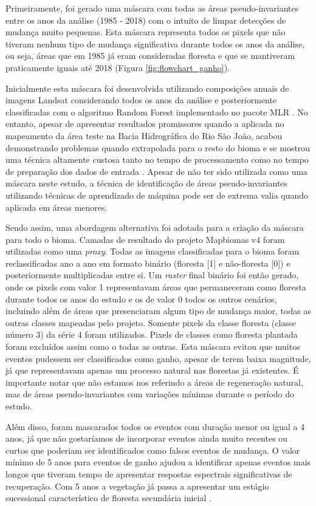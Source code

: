 Primeiramente, foi gerado uma máscara com todas as áreas pseudo-invariantes entre os anos da análise (1985 - 2018) com o intuito de limpar detecções de mudança muito pequenas. Esta máscara representa todos os pixels que não tiveram nenhum tipo de mudança significativa durante todos os anos da análise, ou seja, áreas que em 1985 já eram consideradas floresta e que se mantiveram praticamente iguais até 2018 (Figura \ref{fig:flowchart_ganho}). 

Inicialmente esta máscara foi desenvolvida utilizando composições anuais de imagens Landsat considerando todos os anos da análise e posteriormente classificadas com o algoritmo Random Forest implementado no pacote MLR \citep{mlr}. No entanto, apesar de apresentar resultados promissores quando a aplicada no mapeamento da área teste na Bacia Hidrográfica do Rio São João, acabou demonstrando problemas quando extrapolada para o resto do bioma e se mostrou uma técnica altamente custosa tanto no tempo de processamento como no tempo de preparação dos dados de entrada \citep{LACERDA2021}. Apesar de não ter sido utilizada como uma máscara neste estudo, a técnica de identificação de áreas pseudo-invariantes utilizando técnicas de aprendizado de máquina pode ser de extrema valia quando aplicada em áreas menores.

Sendo assim, uma abordagem alternativa foi adotada para a criação da máscara para todo o bioma. Camadas de resultado do projeto Mapbiomas v4 foram utilizadas como uma \textit{proxy}. Todas as imagens classificadas para o bioma foram reclassificadas ano a ano em formato binário (floresta [1] e não-floresta [0]) e posteriormente multiplicadas entre si. Um \textit{raster} final binário foi então gerado, onde os pixels com valor 1 representavam áreas que permaneceram como floresta durante todos os anos do estudo e os de valor 0 todos os outros cenários, incluindo além de áreas que presenciaram algum tipo de mudança maior, todas as outras classes mapeadas pelo projeto. Somente pixels da classe floresta (classe número 3) da série 4 foram utilizados. Pixels de classes como floresta plantada foram excluídos assim como o todas as outras. Esta máscara evitou que muitos eventos pudessem ser classificados como ganho, apesar de terem baixa magnitude, já que representavam apenas um processo natural nas florestas já existentes. É importante notar que não estamos nos referindo a áreas de regeneração natural, mas de áreas pseudo-invariantes com variações mínimas durante o período do estudo. 

Além disso, foram mascarados todos os eventos com duração menor ou igual a 4 anos, já que não gostaríamos de incorporar eventos ainda muito recentes ou curtos que poderiam ser identificados como falsos eventos de mudança. O valor mínimo de 5 anos para eventos de ganho ajudou a identificar apenas eventos mais longos que tiveram tempo de apresentar respostas espectrais significativas de recuperação. Com 5 anos a vegetação já passa a apresentar um estágio sucessional característico de floresta secundária inicial \citep{Chazdon2014}. 


